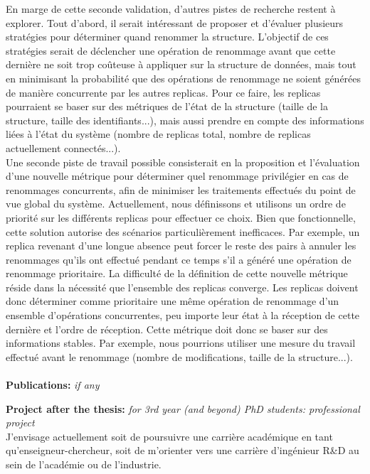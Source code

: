 \documentclass[12pt]{article}
\newcommand{\commentaire}[1]{\small\textit{#1}}
\begin{document}
En marge de cette seconde validation, d'autres pistes de recherche restent à explorer.
Tout d'abord, il serait intéressant de proposer et d'évaluer plusieurs stratégies pour déterminer quand renommer la structure.
L'objectif de ces stratégies serait de déclencher une opération de renommage avant que cette dernière ne soit trop coûteuse à appliquer sur la structure de données, mais tout en minimisant la probabilité que des opérations de renommage ne soient générées de manière concurrente par les autres replicas.
Pour ce faire, les replicas pourraient se baser sur des métriques de l'état de la structure (taille de la structure, taille des identifiants...), mais aussi prendre en compte des informations liées à l'état du système (nombre de replicas total, nombre de replicas actuellement connectés...).
\\

Une seconde piste de travail possible consisterait en la proposition et l'évaluation d'une nouvelle métrique pour déterminer quel renommage privilégier en cas de renommages concurrents, afin de minimiser les traitements effectués du point de vue global du système.
Actuellement, nous définissons et utilisons un ordre de priorité sur les différents replicas pour effectuer ce choix.
Bien que fonctionnelle, cette solution autorise des scénarios particulièrement inefficaces.
Par exemple, un replica revenant d'une longue absence peut forcer le reste des pairs à annuler les renommages qu'ils ont effectué pendant ce temps s'il a généré une opération de renommage prioritaire.
La difficulté de la définition de cette nouvelle métrique réside dans la nécessité que l'ensemble des replicas converge.
Les replicas doivent donc déterminer comme prioritaire une même opération de renommage d'un ensemble d'opérations concurrentes, peu importe leur état à la réception de cette dernière et l'ordre de réception.
Cette métrique doit donc se baser sur des informations stables.
Par exemple, nous pourrions utiliser une mesure du travail effectué avant le renommage (nombre de modifications, taille de la structure...).
\\

\\

\noindent\textbf{Publications:}
\commentaire{%
  if any\\}


\nocite{*}

\noindent\textbf{Project after the thesis:}
\commentaire{%
  for 3rd year (and beyond) PhD students: professional project\\}
J'envisage actuellement soit de poursuivre une carrière académique en tant qu'enseigneur-chercheur, soit de m'orienter vers une carrière d'ingénieur R\&D au sein de l'académie ou de l'industrie.
\\
\end{document}
